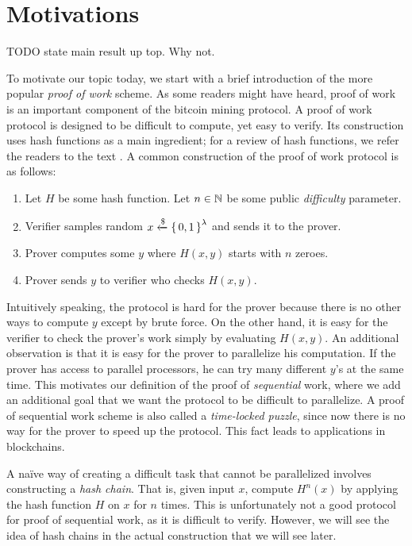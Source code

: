 \section{Motivations}

TODO state main result up top. Why not.

To motivate our topic today, we start with a brief introduction of the more popular \emph{proof of work} scheme.
As some readers might have heard, proof of work is an important component of the bitcoin mining protocol.
A proof of work protocol is designed to be difficult to compute, yet easy to verify.
Its construction uses hash functions as a main ingredient; for a review of hash functions, we refer the readers to the text \cite{intro-algo}.
A common construction of the proof of work protocol is as follows:
\begin{enumerate}
	\item
		Let $H$ be some hash function.
		Let $n\in\mathbb{N}$ be some public \emph{difficulty} parameter.
	\item Verifier samples random $x\xleftarrow{\$}\set{0, 1}^{\lambda}$ and sends it to the prover.
	\item Prover computes some $y$ where $H(x, y)$ starts with $n$ zeroes.
	\item Prover sends $y$ to verifier who checks $H(x, y)$.
\end{enumerate}

Intuitively speaking, the protocol is hard for the prover because there is no other ways to compute $y$ except by brute force.
On the other hand, it is easy for the verifier to check the prover's work simply by evaluating $H(x, y)$.
An additional observation is that it is easy for the prover to parallelize his computation.
If the prover has access to parallel processors, he can try many different $y$'s at the same time.
This motivates our definition of the proof of \emph{sequential} work,
where we add an additional goal that we want the protocol to be difficult to parallelize.
A proof of sequential work scheme is also called a \emph{time-locked puzzle},
since now there is no way for the prover to speed up the protocol.
This fact leads to applications in blockchains.

A na\"ive way of creating a difficult task that cannot be parallelized involves constructing a \emph{hash chain}.
That is, given input $x$, compute $H^n(x)$ by applying the hash function $H$ on $x$ for $n$ times.
This is unfortunately not a good protocol for proof of sequential work, as it is difficult to verify.
However, we will see the idea of hash chains in the actual construction that we will see later.
